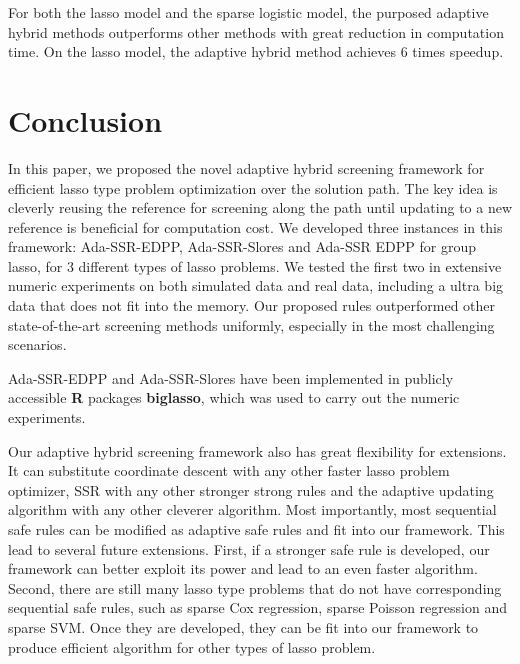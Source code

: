 For both the lasso model and the sparse logistic model, the purposed adaptive hybrid methods outperforms other methods with great reduction in computation time. On the lasso model, the adaptive hybrid method achieves 6 times speedup.

\section{Conclusion}
\label{sec:6}

In this paper, we proposed the novel adaptive hybrid screening framework for efficient lasso type problem optimization over the solution path. The key idea is cleverly reusing the reference for screening along the path until updating to a new reference is beneficial for computation cost.  We developed three instances in this framework: Ada-SSR-EDPP, Ada-SSR-Slores and Ada-SSR EDPP for group lasso, for 3 different types of lasso problems. We tested the first two in extensive numeric experiments on both simulated data and real data, including a ultra big data that does not fit into the memory. Our proposed rules outperformed other state-of-the-art screening methods uniformly, especially in the most challenging scenarios. 

Ada-SSR-EDPP and Ada-SSR-Slores have been implemented in  publicly accessible \textbf{R} packages \textbf{biglasso}\citep{zeng2017biglasso}, which was used to carry out the numeric experiments.

Our adaptive hybrid screening framework also has great flexibility for extensions. It can substitute coordinate descent with any other faster lasso problem optimizer, SSR with any other stronger strong rules and the adaptive updating algorithm with any other cleverer algorithm. Most importantly, most sequential safe rules can be modified as adaptive safe rules and fit into our framework. This lead to several future extensions. First, if a stronger safe rule is developed, our framework can better exploit its power and lead to an even faster algorithm. Second, there are still many lasso type problems that do not have corresponding sequential safe rules, such as sparse Cox regression, sparse Poisson regression and sparse SVM. Once they are developed, they can be fit into our framework to produce efficient algorithm for other types of lasso problem.



